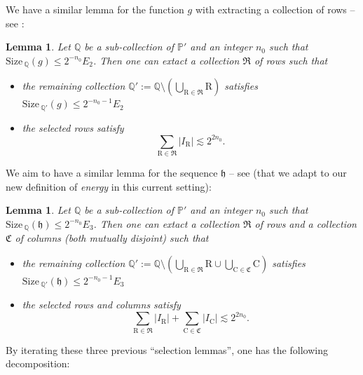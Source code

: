 \documentclass[a4paper,11pt,oneside]{amsart}
\newcommand{\hh}{\mathfrak{h}}
\newcommand{\PP}{\mathbb{P}}
\newcommand{\QQ}{\mathbb{Q}}
\newcommand{\CC}{\mathrm{C}}
\newcommand{\RR}{\mathrm{R}}
\newcommand{\size}{\mathrm{Size\, }}
\theoremstyle{plain}
\newtheorem{lemma}[theorem]{Lemma}
\theoremstyle{definition}
\begin{document}
We have a similar lemma for the function $g$ with extracting a collection of rows -- see \cite[Lemma 3.10]{BB}:

\begin{lemma} \label{lemma:selection:g} Let $\QQ$ be a sub-collection of $\PP'$ and an integer $n_0$ such that $\size_{\QQ}(g)\leq 2^{-n_0} E_2$. Then one can extact a collection $\mathfrak{R}$ of rows such that 
\begin{itemize}
\item the remaining collection $\QQ':=\QQ\setminus (\bigcup_{\RR\in{\mathfrak{R}}} \RR)$ satisfies $\size_{\QQ'}(g)\leq 2^{-n_0-1} E_2$
\item the selected rows satisfy 
$$\sum_{\RR\in{\mathfrak{R}}} |I_{\RR}| \lesssim 2^{2n_0}.$$
\end{itemize}
\end{lemma}

We aim to have a similar lemma for the sequence $\hh$ -- see \cite[Lemma 3.11]{BB} (that we adapt to our new definition of {\it energy} in this current setting):

\begin{lemma} \label{lemma:selection:h}
Let $\QQ$ be a sub-collection of $\PP'$ and an integer $n_0$ such that $\size_{\QQ}(\hh)\leq 2^{-n_0} E_3$. Then one can extact a collection $\mathfrak{R}$ of rows and a collection $\mathfrak{C}$ of columns (both mutually disjoint) such that 
\begin{itemize}
\item the remaining collection $\QQ':=\QQ\setminus (\bigcup_{\RR\in{\mathfrak{R}}} \RR \cup \bigcup_{\CC\in{\mathfrak{C}}} \CC)$ satisfies $\size_{\QQ'}(\hh)\leq 2^{-n_0-1} E_3$
\item the selected rows and columns satisfy 
$$ \sum_{\RR\in{\mathfrak{R}}} |I_{\RR}| + \sum_{\CC\in{\mathfrak{C}}} |I_{\CC}| \lesssim 2^{2 n_0}.$$
\end{itemize}
\end{lemma}

By iterating these three previous ``selection lemmas'', one has the following decomposition:
\end{document}
